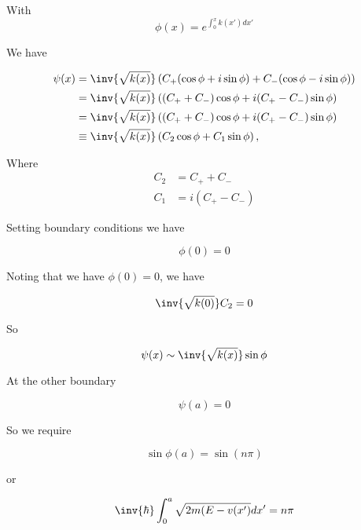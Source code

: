 With
\begin{equation}\label{eqn:qmTwoR3:70}
\phi(x) = e^{\int_0^x k(x') dx'}
\end{equation}

We have

\begin{align*}
\psi(x) 
&= \inv{\sqrt{k(x)}} \left( 
C_{+}(\cos \phi + i\sin\phi) + C_{-}(\cos\phi - i \sin\phi)
\right) \\
&= \inv{\sqrt{k(x)}} \left( 
(C_{+} + C_{-})\cos \phi + i(C_{+} - C_{-}) \sin\phi
\right) \\
&= \inv{\sqrt{k(x)}} \left( 
(C_{+} + C_{-})\cos \phi + i(C_{+} - C_{-}) \sin\phi
\right) \\
&\equiv 
\inv{\sqrt{k(x)}} \left( 
C_2 \cos \phi + C_1 \sin\phi
\right),
\end{align*}

Where
\begin{align}\label{eqn:qmTwoR3:85}
C_2 &= C_{+} + C_{-} \\
C_1 &= i( C_{+} - C_{-})
\end{align}

Setting boundary conditions we have

\begin{equation}\label{eqn:qmTwoR3:90}
\phi(0) = 0
\end{equation}

Noting that we have $\phi(0) = 0$, we have

\begin{equation}\label{eqn:qmTwoR3:110}
\inv{\sqrt{k(0)}} C_2 = 0
\end{equation}

So

\begin{equation}\label{eqn:qmTwoR3:130}
\psi(x) 
\sim
\inv{\sqrt{k(x)}} \sin\phi
\end{equation}

At the other boundary

\begin{equation}\label{eqn:qmTwoR3:150}
\psi(a) = 0
\end{equation}

So we require

\begin{equation}\label{eqn:qmTwoR3:170}
\sin \phi(a) = \sin(n \pi)
\end{equation}

or

\begin{equation}\label{eqn:qmTwoR3:190}
\inv{\hbar} \int_0^a \sqrt{2 m (E - v(x')} dx' = n \pi
\end{equation}

